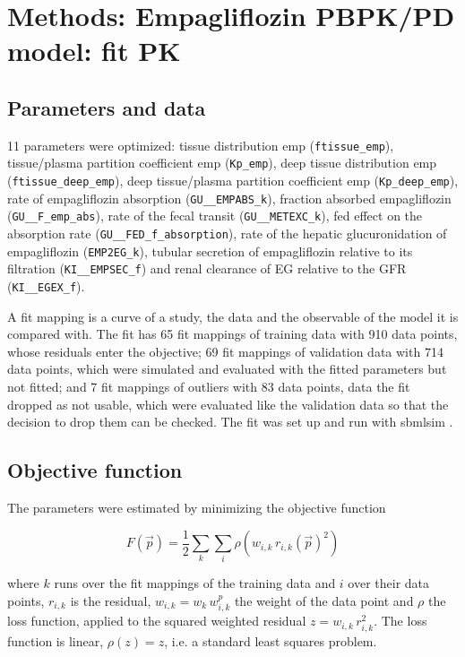 \section{Methods: Empagliflozin PBPK/PD model: fit PK}

\subsection{Parameters and data}

11 parameters were optimized: tissue distribution emp (\texttt{ftissue\_emp}), tissue/plasma partition coefficient emp (\texttt{Kp\_emp}), deep tissue distribution emp (\texttt{ftissue\_deep\_emp}), deep tissue/plasma partition coefficient emp (\texttt{Kp\_deep\_emp}), rate of empagliflozin absorption (\texttt{GU\_\_EMPABS\_k}), fraction absorbed empagliflozin (\texttt{GU\_\_F\_emp\_abs}), rate of the fecal transit (\texttt{GU\_\_METEXC\_k}), fed effect on the absorption rate (\texttt{GU\_\_FED\_f\_absorption}), rate of the hepatic glucuronidation of empagliflozin (\texttt{EMP2EG\_k}), tubular secretion of empagliflozin relative to its filtration (\texttt{KI\_\_EMPSEC\_f}) and renal clearance of EG relative to the GFR (\texttt{KI\_\_EGEX\_f}).

A fit mapping is a curve of a study, the data and the observable of the model it is compared with. The fit has 65 fit mappings of training data with 910 data points, whose residuals enter the objective; 69 fit mappings of validation data with 714 data points, which were simulated and evaluated with the fitted parameters but not fitted; and 7 fit mappings of outliers with 83 data points, data the fit dropped as not usable, which were evaluated like the validation data so that the decision to drop them can be checked. The fit was set up and run with sbmlsim \cite{Koenig2026_sbmlsim}.

\subsection{Objective function}

The parameters were estimated by minimizing the objective function

\begin{equation}
F(\vec{p}) = \frac{1}{2} \sum_{k} \sum_{i} \rho\left(w_{i,k}\, r_{i,k}(\vec{p})^2\right)
\end{equation}

where $k$ runs over the fit mappings of the training data and $i$ over their data points, $r_{i,k}$ is the residual, $w_{i,k} = w_k\, w^{p}_{i,k}$ the weight of the data point and $\rho$ the loss function, applied to the squared weighted residual $z = w_{i,k}\, r_{i,k}^2$. The loss function is linear, $\rho(z) = z$, i.e. a standard least squares problem.

